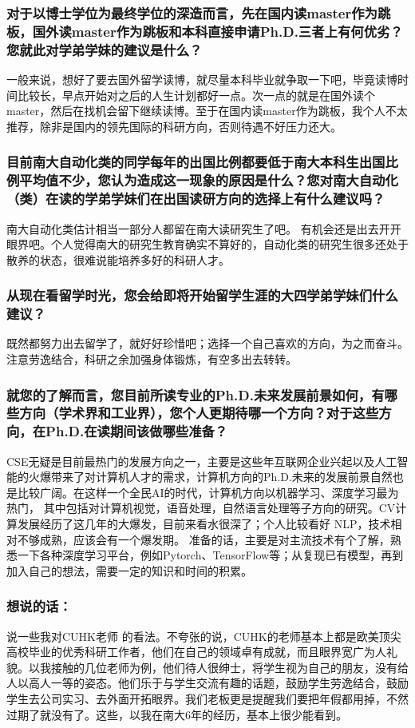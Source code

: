 \documentclass[a4paper,UTF8]{book}
\begin{document}
    \subsubsection*{对于以博士学位为最终学位的深造而言，先在国内读master作为跳板，国外读master作为跳板和本科直接申请Ph.D.三者上有何优劣？您就此对学弟学妹的建议是什么？}
    一般来说，想好了要去国外留学读博，就尽量本科毕业就争取一下吧，毕竟读博时间比较长，早点开始对之后的人生计划都好一点。次一点的就是在国外读个master，然后在找机会留下继续读博。至于在国内读master作为跳板，我个人不太推荐，除非是国内的领先国际的科研方向，否则待遇不好压力还大。

    \subsubsection*{目前南大自动化类的同学每年的出国比例都要低于南大本科生出国比例平均值不少，您认为造成这一现象的原因是什么？您对南大自动化（类）在读的学弟学妹们在出国读研方向的选择上有什么建议吗？}
    南大自动化类估计相当一部分人都留在南大读研究生了吧。
    有机会还是出去开开眼界吧。个人觉得南大的研究生教育确实不算好的，自动化类的研究生很多还处于散养的状态，很难说能培养多好的科研人才。

    \subsubsection*{从现在看留学时光，您会给即将开始留学生涯的大四学弟学妹们什么建议？}
    既然都努力出去留学了，就好好珍惜吧；选择一个自己喜欢的方向，为之而奋斗。注意劳逸结合，科研之余加强身体锻炼，有空多出去转转。

    \subsubsection*{就您的了解而言，您目前所读专业的Ph.D.未来发展前景如何，有哪些方向（学术界和工业界），您个人更期待哪一个方向？对于这些方向，在Ph.D.在读期间该做哪些准备？}
    CSE无疑是目前最热门的发展方向之一，主要是这些年互联网企业兴起以及人工智能的火爆带来了对计算机人才的需求，计算机方向的Ph.D.未来的发展前景自然也是比较广阔。在这样一个全民AI的时代，计算机方向以机器学习、深度学习最为热门， 其中包括对计算机视觉，语音处理，自然语言处理等子方向的研究。CV计算发展经历了这几年的大爆发，目前来看水很深了；个人比较看好 NLP，技术相对不够成熟，应该会有一个爆发期。
    准备的话，主要是对主流技术有个了解，熟悉一下各种深度学习平台，例如Pytorch、TensorFlow等；从复现已有模型，再到加入自己的想法，需要一定的知识和时间的积累。
    
    \subsubsection{想说的话：}
    说一些我对CUHK老师 的看法。不夸张的说，CUHK的老师基本上都是欧美顶尖高校毕业的优秀科研工作者，他们在自己的领域卓有成就，而且眼界宽广为人礼貌。以我接触的几位老师为例，他们待人很绅士，将学生视为自己的朋友，没有给人以高人一等的姿态。他们乐于与学生交流有趣的话题，鼓励学生劳逸结合，鼓励学生去公司实习、去外面开拓眼界。我们老板更是提醒我们要把年假都用掉，不然过期了就没有了。这些，以我在南大6年的经历，基本上很少能看到。
\end{document}
